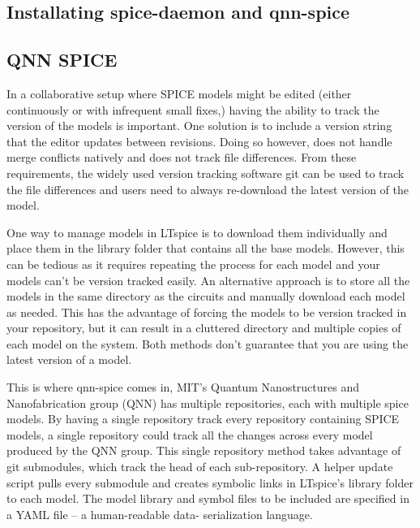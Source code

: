 \documentclass{article}
\begin{document}







\subsection{Installating spice-daemon and qnn-spice}

\subsection{QNN SPICE} \label{qnn-spice}

In a collaborative setup where SPICE models might be edited (either continuously or with infrequent small fixes,) 
having the ability to track the version of the models is important. One solution is to include a version 
string that the editor updates between revisions. Doing so however, does not handle merge conflicts natively and
does not track file differences. From these requirements, the widely used version tracking software git can be
used to track the file differences and users need to always re-download the latest version of the model.

One way to manage models in LTspice is to download them individually and place them in the library folder that contains 
all the base models. However, this can be tedious as it requires repeating the process for each model and your
models can't be version tracked easily. An alternative
approach is to store all the models in the same directory as the circuits and manually download each model as needed. 
This has the advantage of forcing the models to be version tracked in your repository, but it can result in a cluttered 
directory and multiple copies of each model on the system. Both methods don't guarantee that you are using the latest
version of a model.

This is where qnn-spice comes in, MIT's Quantum Nanostructures and Nanofabrication group (QNN) has multiple
repositories, each with multiple spice models. By having a single repository track every repository containing
SPICE models, a single repository could track all the changes across every model produced by the QNN group. 
This single repository method takes advantage of git submodules, which track the head of each sub-repository.
A helper update script pulls every submodule and creates symbolic links in LTspice's library folder to each model.
The model library and symbol files to be included are specified in a YAML file -- a human-readable data-
serialization language.
\end{document}
